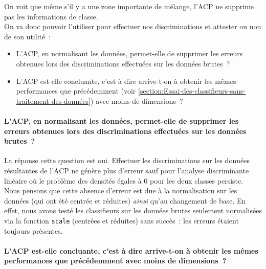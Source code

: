\documentclass[a4paper,10pt]{report}
\begin{document}
On voit que même s'il y a une zone importante de mélange, l'ACP ne supprime pas les informations de classe.\\

On va donc pouvoir l'utiliser pour effectuer nos discriminations et attester ou non de son utilité~:
\begin{itemize}
	\item L'ACP, en normalisant les données, permet-elle de supprimer les erreurs obtenues lors des discriminations effectuées sur les données brutes~?
	\item L'ACP est-elle concluante, c'est à dire arrive-t-on à obtenir les mêmes performances que précédemment (voir \autoref{section:Essai-des-classifieurs-sans-traitement-des-données}) avec moins de dimensions~?\\
\end{itemize}



\paragraph{L'ACP, en normalisant les données, permet-elle de supprimer les erreurs obtenues lors des discriminations effectuées sur les données brutes~?}

La réponse cette question est oui. Effectuer les discriminations sur les données résultantes de l'ACP ne génère plus d'erreur sauf pour l'analyse discriminante linéaire où le problème des densités égales à 0 pour les deux classes persiste.\\
Nous pensons que cette absence d'erreur est due à la normalisation sur les données (qui ont été centrée et réduites) \textit{ainsi} qu'au changement de base. En effet, nous avons testé les classifieurs sur les données brutes seulement normalisées via la fonction \texttt{scale} (centrées et réduites) sans succès~: les erreurs étaient toujours présentes.\\



\paragraph{L'ACP est-elle concluante, c'est à dire arrive-t-on à obtenir les mêmes performances que précédemment avec moins de dimensions~?}
\end{document}
